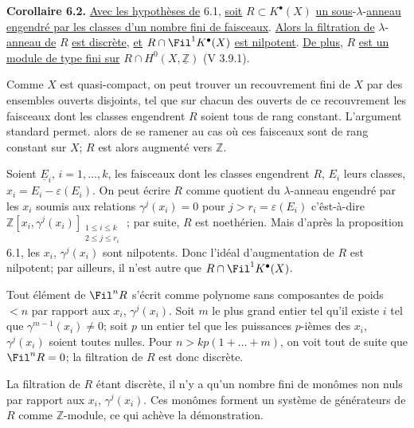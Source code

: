 
\textbf{Corollaire 6.2.} \uline{Avec les hypothèses de} 6.1, \uline{soit} $R\subset K^{\bullet}(X)$ \uline{un sous}-$\lambda$-\uline{anneau engendré par les classes d'un nombre fini de faisceaux}. \uline{Alors la filtration de} $\lambda$-\uline{anneau de} $R$ \uline{est discrète}, \uline{et} $R\cap\Fil^1K^{\bullet}(X)$ \uline{est nilpotent}. \uline{De plus}, $R$ \uline{est un module de type fini sur} $R\cap H^0(X,\underline{\mathbb Z})$ (V 3.9.1).

Comme $X$ est quasi-compact, on peut trouver un recouvrement fini de $X$ par des ensembles ouverts disjoints, tel que sur chacun des ouverts de ce recouvrement les faisceaux dont les classes engendrent $R$ soient tous de rang constant. L'argument standard permet. alors de se ramener au cas où ces faisceaux sont de rang constant sur $X$; $R$ est alors augmenté vers $\mathbb Z$.

Soient $\underline{E}_i$, $i=1,\ldots,k$, les faisceaux dont les classes engendrent $R$, $E_i$ leurs classes, $x_i=E_i-\varepsilon(E_i)$. On peut écrire $R$ comme quotient du $\lambda$-anneau engendré par les $x_i$ soumis aux relations $\gamma^j(x_i)=0$ pour $j>r_i=\varepsilon(E_i)$ c'êst-à-dire $\mathbb Z[x_i,\gamma^j(x_i)]_{\substack{1\le i\le k\\2\le j\le r_i}}$ ; par suite, $R$ est noethérien. Mais d'après la proposition 6.1, les $x_i$, $\gamma^j(x_i)$ sont nilpotents. Donc l'idéal d'augmentation de $R$ est nilpotent; par ailleurs, il n'est autre que $R\cap\Fil^1K^{\bullet}(X)$.

Tout élément de $\Fil^n R$ s'écrit comme polynome sans composantes de poids $<n$ par rapport aux $x_i$, $\gamma^j(x_i)$. Soit $m$ le plus grand entier tel qu'il existe $i$ tel que $\gamma^{m-1}(x_i)\ne0$; soit $p$ un entier tel que les puissances $p$-ièmes des $x_i$, $\gamma^j(x_i)$ soient toutes nulles. Pour $n>kp(1+\ldots+m)$, on voit tout de suite que $\Fil^nR=0$; la filtration de $R$ est donc discrète.

La filtration de $R$ étant discrète, il n'y a qu'un nombre fini de monômes non nuls par rapport aux $x_i$, $\gamma^j(x_i)$. Ces monômes forment un système de générateurs de $R$ comme $\mathbb Z$-module, ce qui achève la démonstration.

